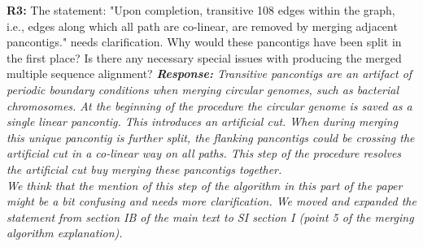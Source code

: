 \documentclass[aps,rmp,onecolumn]{revtex4-1}
\newcommand{\Marco}[1]{{\color{gray}Marco: #1}}
\newcommand{\Liam}[1]{{\color{teal}Liam: #1}}
\newcommand{\reviewer}[2]{\textbf{#1:} #2\vskip 5mm}
\newcommand{\response}[1]{{\it {\color{response}\textbf{Response:} #1}}\vskip 5mm}
\begin{document}
\reviewer{R3}{The statement: "Upon completion, transitive 108 edges within the graph, i.e., edges along which all path are co-linear, are removed by merging adjacent pancontigs." needs clarification. Why would these pancontigs have been split in the first place? Is there any necessary special issues with producing the merged multiple sequence alignment?}
\response{Transitive pancontigs are an artifact of periodic boundary conditions when merging circular genomes, such as bacterial chromosomes. At the beginning of the procedure the circular genome is saved as a single linear pancontig. This introduces an artificial cut. When during merging this unique pancontig is further split, the flanking pancontigs could be crossing the artificial cut in a co-linear way on all paths. This step of the procedure resolves the artificial cut buy merging these pancontigs together.\\
      We think that the mention of this step of the algorithm in this part of the paper might be a bit confusing and needs more clarification. We moved and expanded the statement from section IB of the main text to SI section I (point 5 of the merging algorithm explanation).}
\end{document}
